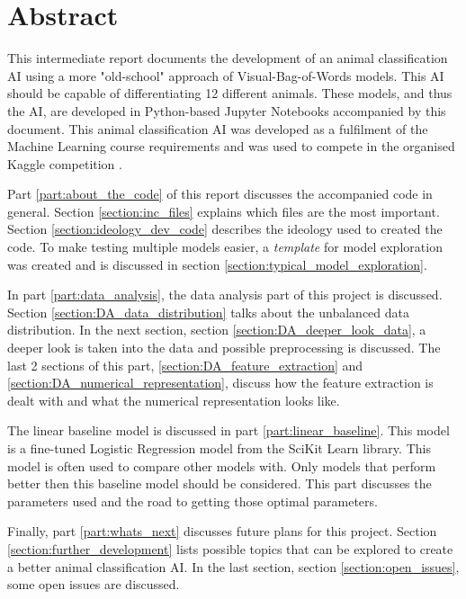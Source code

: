 \chapter*{Abstract}

This intermediate report documents the development of an animal classification AI using a more "old-school" approach of Visual-Bag-of-Words models.
This AI should be capable of differentiating 12 different animals.
These models, and thus the AI, are developed in Python-based Jupyter Notebooks accompanied by this document.
This animal classification AI was developed as a fulfilment of the Machine Learning course requirements and was used to compete in the organised Kaggle competition \citep{kaggle_competition}.

Part \ref{part:about_the_code} of this report discusses the accompanied code in general.
Section \ref{section:inc_files} explains which files are the most important. 
Section \ref{section:ideology_dev_code} describes the ideology used to created the code. 
To make testing multiple models easier, a \emph{template} for model exploration was created and is discussed in section \ref{section:typical_model_exploration}.

In part \ref{part:data_analysis}, the data analysis part of this project is discussed.
Section \ref{section:DA_data_distribution} talks about the unbalanced data distribution.
In the next section, section \ref{section:DA_deeper_look_data}, a deeper look is taken into the data and possible preprocessing is discussed.
The last 2 sections of this part, \ref{section:DA_feature_extraction} and \ref{section:DA_numerical_representation}, discuss how the feature extraction is dealt with and what the numerical representation looks like.

The linear baseline model is discussed in part \ref{part:linear_baseline}.
This model is a fine-tuned Logistic Regression model from the SciKit Learn library.
This model is often used to compare other models with.
Only models that perform better then this baseline model should be considered.
This part discusses the parameters used and the road to getting those optimal parameters.

Finally, part \ref{part:whats_next} discusses future plans for this project.
Section \ref{section:further_development} lists possible topics that can be explored to create a better animal classification AI.
In the last section, section \ref{section:open_issues}, some open issues are discussed.